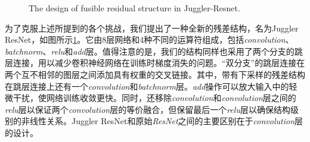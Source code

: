 \begin{figure}[h]
	\centering
	\caption{The design of fusible residual structure in Juggler-Resnet.}
	\label{our_fusible_multibranch}
\end{figure}

为了克服上述所提到的各个挑战，我们提出了一种全新的残差结构，名为Juggler ResNet，如图所示\ref{our_fusible_multibranch}。它由8层网络和4种不同的运算符组成，包括\emph{convolution}、\emph{batchnorm}、\emph{relu}和\emph{add}层。值得注意的是，我们的结构同样也采用了两个分支的跳层连接，用以减少卷积神经网络在训练时梯度消失的问题。“双分支”的跳层连接在两个互不相邻的图层之间添加具有权重的交叉链接。其中，带有下采样的残差结构在跳层连接上还有一个\emph{convolution}和\emph{batchnorm}层。\emph{add}操作可以放大输入中的轻微干扰，使网络训练收敛更快。同时，还移除\emph{convolution}和\emph{convolution}层之间的\emph{relu}层以保证两个\emph{convolution}层的等价融合，但保留最后一个\emph{relu}层以确保结构级别的非线性关系。Juggler ResNet和原始\emph{ResNet}之间的主要区别在于\emph{convolution}层的设计。


